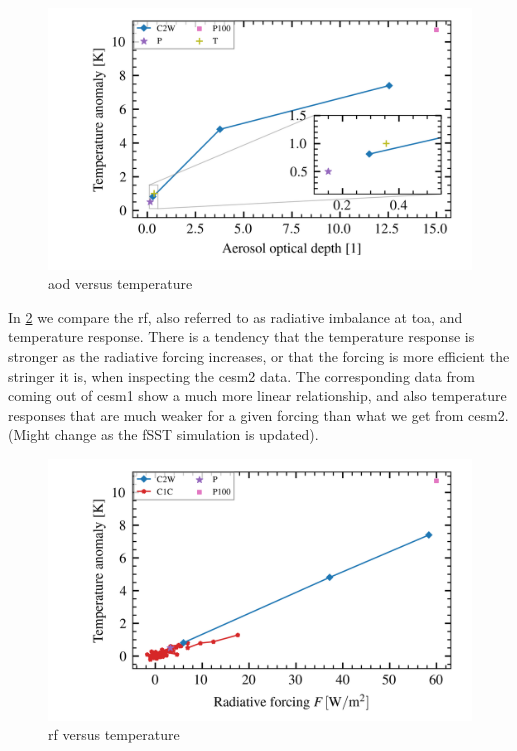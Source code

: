 \documentclass[twocol]{ametsocV5}
\begin{document}
\begin{figure}
  \begin{center}
    \includegraphics[width=0.95\linewidth]{figures/aod_vs_temperature.png}
  \end{center}
  \caption{\acrshort{aod} versus temperature}%
  \label{fig:aod_vs_temp}
\end{figure}

In \cref{fig:toa_vs_temp} we compare the \acrshort{rf}, also referred to as radiative
imbalance at \acrshort{toa}, and temperature response. There is a tendency that the
temperature response is stronger as the radiative forcing increases, or that the forcing
is more efficient the stringer it is, when inspecting the \acrshort{cesm2} data. The
corresponding data from \citet{ottobliesner2016} coming out of \acrshort{cesm1} show a
much more linear relationship, and also temperature responses that are much weaker for a
given forcing than what we get from \acrshort{cesm2}. (Might change as the fSST
simulation is updated).

\begin{figure}
  \begin{center}
    \includegraphics[width=0.95\linewidth]{figures/toa_vs_temperature.png}
  \end{center}
  \caption{\acrshort{rf} versus temperature}%
  \label{fig:toa_vs_temp}
\end{figure}
\end{document}
